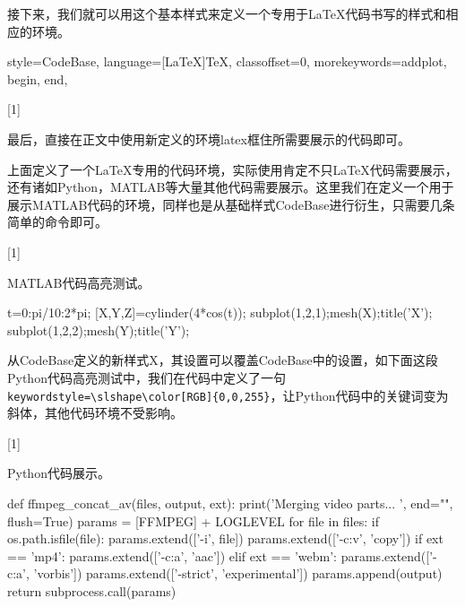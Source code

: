 \begin{latex}

\end{latex}

接下来，我们就可以用这个基本样式来定义一个专用于\LaTeX{}代码书写的样式和相应的环境。

\begin{latex}
{
    style=CodeBase,
    language=[LaTeX]TeX,
    classoffset=0,
    morekeywords={addplot, begin, end},
}

[1]{\lstset{style=LaTeX}}{}
\end{latex}

最后，直接在正文中使用新定义的环境latex框住所需要展示的代码即可。

上面定义了一个\LaTeX{}专用的代码环境，实际使用肯定不只\LaTeX{}代码需要展示，还有诸如Python，MATLAB等大量其他代码需要展示。这里我们在定义一个用于展示MATLAB代码的环境，同样也是从基础样式CodeBase进行衍生，只需要几条简单的命令即可。

\begin{latex}

[1]{\lstset{style=Matlab}}{}
\end{latex}

MATLAB代码高亮测试。

\begin{matlab}
t=0:pi/10:2*pi;
[X,Y,Z]=cylinder(4*cos(t));
subplot(1,2,1);mesh(X);title('X');
subplot(1,2,2);mesh(Y);title('Y');
\end{matlab}

从CodeBase定义的新样式X，其设置可以覆盖CodeBase中的设置，如下面这段Python代码高亮测试中，我们在代码中定义了一句\lstinline|keywordstyle=\slshape\color[RGB]{0,0,255}|，让Python代码中的关键词变为斜体，其他代码环境不受影响。

\begin{latex}
[1]{\lstset{style=python}}{}
\end{latex}

Python代码展示。

\begin{python}{}
def ffmpeg_concat_av(files, output, ext):
    print('Merging video parts... ', end="", flush=True)
    params = [FFMPEG] + LOGLEVEL
    for file in files:
        if os.path.isfile(file): params.extend(['-i', file])
    params.extend(['-c:v', 'copy'])
    if ext == 'mp4':
        params.extend(['-c:a', 'aac'])
    elif ext == 'webm':
        params.extend(['-c:a', 'vorbis'])
    params.extend(['-strict', 'experimental'])
    params.append(output)
    return subprocess.call(params)
\end{python}

